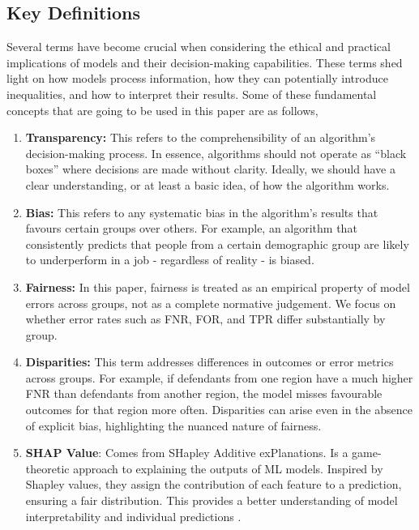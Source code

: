 \documentclass[fleqn,10pt]{wlscirep}
\begin{document}
\subsection{Key Definitions}

Several terms have become crucial when considering the ethical and practical implications of models and their decision-making capabilities. These terms shed light on how models process information, how they can potentially introduce inequalities, and how to interpret their results. Some of these fundamental concepts that are going to be used in this paper are as follows,

\begin{enumerate}
    \item \textbf{Transparency:} This refers to the comprehensibility of an algorithm's decision-making process. In essence, algorithms should not operate as ``black boxes'' where decisions are made without clarity. Ideally, we should have a clear understanding, or at least a basic idea, of how the algorithm works.
    
    \item \textbf{Bias:} This refers to any systematic bias in the algorithm's results that favours certain groups over others. For example, an algorithm that consistently predicts that people from a certain demographic group are likely to underperform in a job - regardless of reality - is biased.
    
    \item \textbf{Fairness:} In this paper, fairness is treated as an empirical property of model errors across groups, not as a complete normative judgement. We focus on whether error rates such as FNR, FOR, and TPR differ substantially by group.

    \item \textbf{Disparities:} This term addresses differences in outcomes or error metrics across groups. For example, if defendants from one region have a much higher FNR than defendants from another region, the model misses favourable outcomes for that region more often. Disparities can arise even in the absence of explicit bias, highlighting the nuanced nature of fairness.

    \item \textbf{SHAP Value}: Comes from SHapley Additive exPlanations. Is a game-theoretic approach to explaining the outputs of ML models. Inspired by Shapley values, they assign the contribution of each feature to a prediction, ensuring a fair distribution. This provides a better understanding of model interpretability and individual predictions \cite{rozemberczki2022shapley}.
\end{enumerate}
\end{document}
